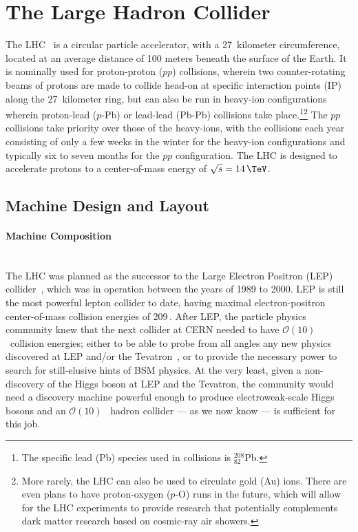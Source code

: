 \section{The Large Hadron Collider}
\label{sec:lhc}

The LHC~\cite{LHCMachine} is a circular particle accelerator, with a 27~kilometer circumference,
located at an average distance of 100 meters beneath the surface of the Earth.
It is nominally used for proton-proton ($pp$) collisions, wherein two counter-rotating
beams of protons are made to collide head-on at specific interaction points (IP) along the 27~kilometer
ring, but can also be run in heavy-ion configurations wherein proton-lead ($p$-Pb) or lead-lead (Pb-Pb)
collisions take place.\footnote{The specific lead (Pb) species used in collisions is $^{208}_{82}$Pb.}\footnote{More rarely, the LHC can also be used to circulate gold (Au) ions.
There are even plans to have proton-oxygen ($p$-O) runs in the future, which will allow
for the LHC experiments to provide research that potentially complements dark matter research
based on cosmic-ray air showers.}
The $pp$ collisions take priority over those of the heavy-ions, with the collisions each year
consisting of only a few weeks in the winter for the heavy-ion configurations and typically
six to seven months for the $pp$ configuration. The LHC is designed to accelerate protons to a
center-of-mass energy of $\sqrt{s} = 14\,\TeV$.

\subsection{Machine Design and Layout}
\label{sec:lhc_layout}

\paragraph{Machine Composition} \mbox{} \\
\label{sec:dipole}
The LHC was planned as the successor to the Large Electron Positron (LEP) collider~\cite{LEPI,LEPII}, which was in operation
between the years of 1989 to 2000. LEP is still the most powerful lepton collider to date, having maximal electron-positron
center-of-mass collision energies of 209\,\GeV.
After LEP, the particle physics community knew that the next collider at CERN needed to have $\mathcal{O}(10)$\,\TeV~collision
energies; either to be able to probe from all angles any new physics discovered at LEP and/or the Tevatron~\cite{TevatronDesignI}, or
to provide the necessary power to search for still-elusive hints of BSM physics. At the very least,
given a non-discovery of the Higgs boson at LEP and the Tevatron, the community would need a discovery machine powerful enough
to produce electroweak-scale Higgs bosons and an $\mathcal{O}(10)$ \TeV~hadron collider --- as we now know --- is sufficient for this job.


